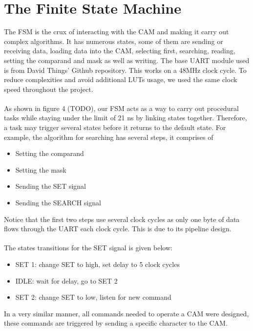 \section{The Finite State Machine}
The FSM is the crux of interacting with the CAM and making it carry out complex algorithms. 
It has numerous states, some of them are sending or receiving data, loading data into the CAM, selecting first, searching, reading, setting the comparand and mask as well as writing. 
The base UART module used is from David Things' Github repository. \cite{uart} This works on a 48MHz clock cycle.
To reduce complexities and avoid additional LUTs usage, we used the same clock speed throughout the project. 
\\\\
As shown in figure 4 (TODO), our FSM acts as a way to carry out procedural tasks while staying under the limit of 21 ns by linking states together. 
Therefore, a task may trigger several states before it returns to the default state. 
For example, the algorithm for searching has several steps, it comprises of
\begin{itemize}
    \item Setting the comparand 
    \item Setting the mask 
    \item Sending the SET signal 
    \item Sending the SEARCH signal 
\end{itemize}
Notice that the first two steps use several clock cycles as only one byte of data flows through the UART each clock cycle. 
This is due to its pipeline design. 
\\\\
The states transitions for the SET signal is given below:
\begin{itemize}
    \item  SET 1: change SET to high, set delay to 5 clock cycles
    \item  IDLE: wait for delay, go to SET 2
    \item  SET 2: change SET to low, listen for new command
\end{itemize}
In a very similar manner, all commands needed to operate a CAM were designed, these commands are triggered by sending a specific character to the CAM. 